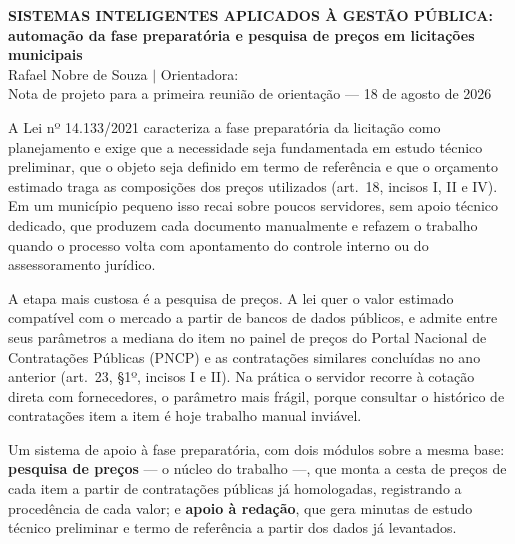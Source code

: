 \documentclass[12pt,a4paper,oneside]{article}
\let\section\ufopaoriginalsection
\begin{document}
\begin{center}
  \begin{singlespace}
    {\bfseries\MakeUppercase{Sistemas inteligentes aplicados à gestão pública:}}\\
    {\bfseries automação da fase preparatória e pesquisa de preços em licitações
     municipais}\\[8pt]
    {\small Rafael Nobre de Souza \quad$\vert$\quad
     Orientadora: \ufopaimprimirorientador\\
     Nota de projeto para a primeira reunião de orientação --- 18 de agosto de 2026}
  \end{singlespace}
\end{center}

\section*{1\quad O problema}

A Lei nº 14.133/2021 caracteriza a fase preparatória da licitação como
planejamento e exige que a necessidade seja fundamentada em estudo técnico
preliminar, que o objeto seja definido em termo de referência e que o orçamento
estimado traga as composições dos preços utilizados (art.~18, incisos I, II e
IV). Em um município pequeno isso recai sobre poucos servidores, sem apoio
técnico dedicado, que produzem cada documento manualmente e refazem o trabalho
quando o processo volta com apontamento do controle interno ou do
assessoramento jurídico.

A etapa mais custosa é a pesquisa de preços. A lei quer o valor estimado
compatível com o mercado a partir de bancos de dados públicos, e admite entre
seus parâmetros a mediana do item no painel de preços do Portal Nacional de
Contratações Públicas (PNCP) e as contratações similares concluídas no ano
anterior (art.~23, §1º, incisos I e II). Na prática o servidor recorre à cotação
direta com fornecedores, o parâmetro mais frágil, porque consultar o histórico
de contratações item a item é hoje trabalho manual inviável.

\section*{2\quad A proposta}

Um sistema de apoio à fase preparatória, com dois módulos sobre a mesma base:
\textbf{pesquisa de preços} --- o núcleo do trabalho ---, que monta a cesta de
preços de cada item a partir de contratações públicas já homologadas,
registrando a procedência de cada valor; e \textbf{apoio à redação}, que gera
minutas de estudo técnico preliminar e termo de referência a partir dos dados
já levantados.
\end{document}
